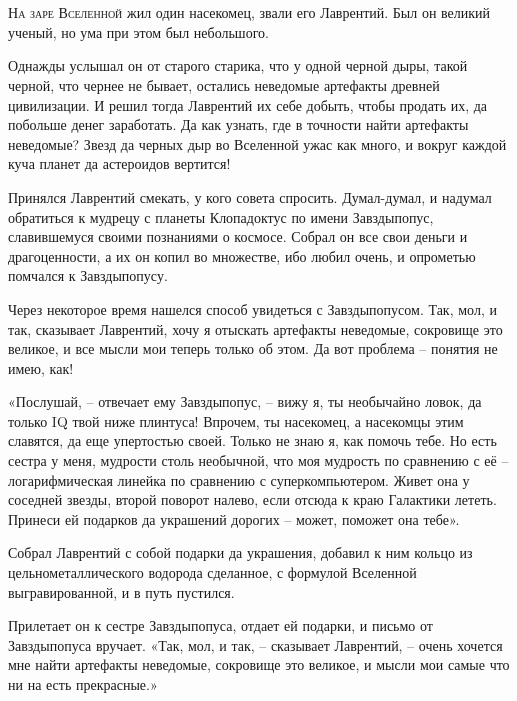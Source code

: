 \documentclass[ebook,oneside,final,openright]{memoir}
\begin{document}
\chapter{}
 \lettrine{Н}{а заре Вселенной} жил один насекомец, звали его Лаврентий. Был он великий ученый, но ума при этом был небольшого.\par
\par
Однажды услышал он от старого старика, что у одной черной дыры, такой черной, что чернее не бывает, остались неведомые артефакты древней цивилизации. И решил тогда Лаврентий их себе добыть, чтобы продать их, да побольше денег заработать. Да как узнать, где в точности найти артефакты неведомые? Звезд да черных дыр во Вселенной ужас как много, и вокруг каждой куча планет да астероидов вертится!\par
\par
Принялся Лаврентий смекать, у кого совета спросить. Думал-думал, и надумал обратиться к мудрецу с планеты Клопадоктус по имени Завздыпопус, славившемуся своими познаниями о космосе. Собрал он все свои деньги и драгоценности, а их он копил во множестве, ибо любил очень, и опрометью помчался к Завздыпопусу.\par
\par
Через некоторое время нашелся способ увидеться с Завздыпопусом. Так, мол, и так, сказывает Лаврентий, хочу я отыскать артефакты неведомые, сокровище это великое, и все мысли мои теперь только об этом. Да вот проблема – понятия не имею, как!\par
\par
«Послушай, – отвечает ему Завздыпопус, – вижу я, ты необычайно ловок, да только IQ твой ниже плинтуса! Впрочем, ты насекомец, а насекомцы этим славятся, да еще упертостью своей. Только не знаю я, как помочь тебе. Но есть сестра у меня, мудрости столь необычной, что моя мудрость по сравнению с её – логарифмическая линейка по сравнению с суперкомпьютером. Живет она у соседней звезды, второй поворот налево, если отсюда к краю Галактики лететь. Принеси ей подарков да украшений дорогих – может, поможет она тебе».\par
\par
Собрал Лаврентий с собой подарки да украшения, добавил к ним кольцо из цельнометаллического водорода сделанное, с формулой Вселенной выгравированной, и в путь пустился.\par
\par
Прилетает он к сестре Завздыпопуса, отдает ей подарки, и письмо от Завздыпопуса вручает. «Так, мол, и так, – сказывает Лаврентий, – очень хочется мне найти артефакты неведомые, сокровище это великое, и мысли мои самые что ни на есть прекрасные.»\par
\end{document}
